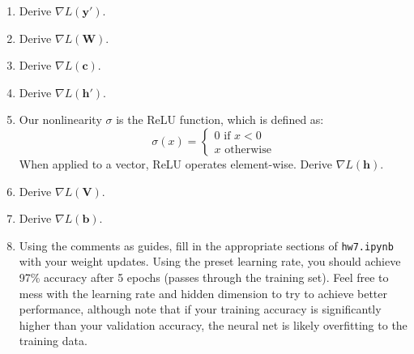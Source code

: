\documentclass{article}
\begin{document}
\begin{enumerate}[label=\arabic*.]
\item Derive $\nabla L(\mathbf{y'})$.
\item Derive $\nabla L(\mathbf{W})$.
\item Derive $\nabla L(\mathbf{c})$.
\item Derive $\nabla L(\mathbf{h'})$.
\item Our nonlinearity $\sigma$ is the ReLU function, which is defined as: $$ \sigma(x) = \begin{cases} 0 \text{ if } x < 0 \\ x \text{ otherwise} \end{cases}$$ When applied to a vector, ReLU operates element-wise. Derive $\nabla L(\mathbf{h})$.
\item Derive $\nabla L(\mathbf{V})$.
\item Derive $\nabla L(\mathbf{b})$.
\item Using the comments as guides, fill in the appropriate sections of \verb|hw7.ipynb| with your weight updates. Using the preset learning rate, you should achieve 97\% accuracy after 5 epochs (passes through the training set). Feel free to mess with the learning rate and hidden dimension to try to achieve better performance, although note that if your training accuracy is significantly higher than your validation accuracy, the neural net is likely overfitting to the training data.
\end{enumerate}
\end{document}
